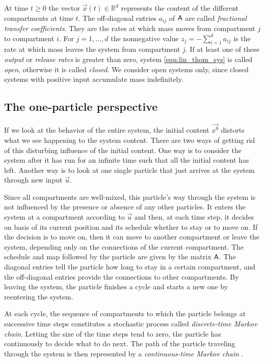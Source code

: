 \documentclass[smallextended]{svjour3}
\newcommand{\R}{\mathbb{R}}
\begin{document}
At time $t\geq0$ the vector $\vec{x}(t)\in\R^d$ represents the content of the different compartments at time $t$.
The off-diagonal entries $a_{ij}$ of $\mathsf{A}$ are called \emph{fractional transfer coefficients}.
They are the rates at which mass moves from compartment $j$ to compartment $i$.
For $j=1,\ldots,d$ the nonnegative value $z_j=-\sum_{i=1}^d a_{ij}$ is the rate at which mass leaves the system from compartment $j$.
If at least one of these \emph{output} or \emph{release rates} is greater than zero, system \eqref{eqn:lin_thom_sys} is called \emph{open}, otherwise it is called \emph{closed}.
We consider open systems only, since closed systems with positive input accumulate mass indefinitely.

\subsection{The one-particle perspective}

If we look at the behavior of the entire system, the initial content $\vec{x^0}$ distorts what we see happening to the system content.
There are two ways of getting rid of this disturbing influence of the initial content.
One way is to consider the system after it has run for an infinite time such that all the initial content has left.
Another way is to look at one single particle that just arrives at the system through new input $\vec{u}$.

Since all compartments are well-mixed, this particle's way through the system is not influenced by the presence or absence of any other particles.
It enters the system at a compartment according to $\vec{u}$ and then, at each time step, it decides on basis of its current position and its schedule whether to stay or to move on.
If the decision is to move on, then it can move to another compartment or leave the system, depending only on the connections of the current compartment.
The schedule and map followed by the particle are given by the matrix $\mathsf{A}$.
The diagonal entries tell the particle how long to stay in a certain compartment, and the off-diagonal entries provide the connections to other compartments.
By leaving the system, the particle finishes a cycle and starts a new one by reentering the system.

At each cycle, the sequence of compartments to which the particle belongs at successive time steps constitutes a stochastic process called \emph{discrete-time Markov chain}.
Letting the size of the time steps tend to zero, the particle has continuously to decide what to do next.
The path of the particle traveling through the system is then represented by a \emph{continuous-time Markov chain} \citep{Norris1997}.
\end{document}
